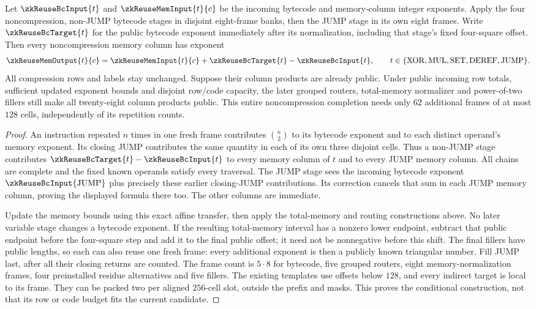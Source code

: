 \begin{proposition}\label{prop:zk-reused-count-frames}
Let $\zkReuseBcInput{t}$ and $\zkReuseMemInput{t}{c}$ be the incoming bytecode and memory-column integer exponents. Apply the four noncompression, non-JUMP bytecode stages in disjoint eight-frame banks, then the JUMP stage in its own eight frames. Write $\zkReuseBcTarget{t}$ for the public bytecode exponent immediately after its normalization, including that stage's fixed four-square offset. Then every noncompression memory column has exponent
\[
 \zkReuseMemOutput{t}{c}
 =\zkReuseMemInput{t}{c}+\zkReuseBcTarget{t}-\zkReuseBcInput{t},
 \qquad t\in\{\mathrm{XOR},\mathrm{MUL},\mathrm{SET},\mathrm{DEREF},\mathrm{JUMP}\}.
\]
All compression rows and labels stay unchanged. Suppose their column products are already public. Under public incoming row totals, sufficient updated exponent bounds and disjoint row/code capacity, the later grouped routers, total-memory normalizer and power-of-two fillers still make all twenty-eight column products public. This entire noncompression completion needs only $62$ additional frames of at most $128$ cells, independently of its repetition counts.
\end{proposition}
\begin{proof}
An instruction repeated $n$ times in one fresh frame contributes $\binom n2$ to its bytecode exponent and to each distinct operand's memory exponent. Its closing JUMP contributes the same quantity in each of its own three disjoint cells. Thus a non-JUMP stage contributes $\zkReuseBcTarget{t}-\zkReuseBcInput{t}$ to every memory column of $t$ and to every JUMP memory column. All chains are complete and the fixed known operands satisfy every traversal. The JUMP stage sees the incoming bytecode exponent $\zkReuseBcInput{\mathrm{JUMP}}$ plus precisely these earlier closing-JUMP contributions. Its correction cancels that sum in each JUMP memory column, proving the displayed formula there too. The other columns are immediate.

Update the memory bounds using this exact affine transfer, then apply the total-memory and routing constructions above. No later variable stage changes a bytecode exponent. If the resulting total-memory interval has a nonzero lower endpoint, subtract that public endpoint before the four-square step and add it to the final public offset; it need not be nonnegative before this shift. The final fillers have public lengths, so each can also reuse one fresh frame: every additional exponent is then a publicly known triangular number. Fill JUMP last, after all their closing returns are counted. The frame count is $5\cdot8$ for bytecode, five grouped routers, eight memory-normalization frames, four preinstalled residue alternatives and five fillers. The existing templates use offsets below $128$, and every indirect target is local to its frame. They can be packed two per aligned $256$-cell slot, outside the prefix and masks. This proves the conditional construction, not that its row or code budget fits the current candidate.
\end{proof}

